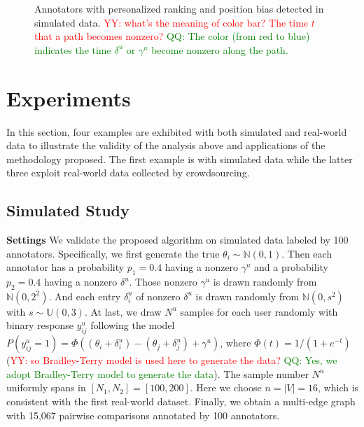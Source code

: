 \documentclass[10pt,journal,cspaper,compsoc]{IEEEtran}
\def\N{{\mathbb N}}
\begin{document}
{\begin{figure}[t]
\begin{center}
  \caption{Annotators with personalized ranking and position bias detected in simulated data. \textcolor{red}{YY: what's the meaning of color bar? The time $t$ that a path becomes nonzero?} \textcolor{green}{QQ: The color (from red to blue) indicates the time $\delta^u$ or $\gamma^u$ become nonzero along the path.}}
\end{center}
\end{figure}


\section{Experiments}\label{sec:experiment}

In this section, four examples are exhibited with both
simulated and real-world data to illustrate the validity of
the analysis above and applications of the methodology proposed.
The first example is with simulated data while the
latter three exploit real-world data collected by crowdsourcing.

\subsection{Simulated Study}
\textbf{Settings} We validate the proposed algorithm on simulated data labeled by 100 annotators.
Specifically, we first generate the true $\theta_i \sim \N(0,1)$.
Then each annotator has a probability $p_1 = 0.4$ having a nonzero $\gamma^u$ and a probability $p_2 = 0.4$ having a nonzero $\delta^u$.
Those nonzero $\gamma^u$ is drawn randomly from $\N(0,2^2)$. And each entry $\delta_i^u$ of nonzero $\delta^u$ is drawn randomly from $\N(0,s^2)$ with $s \sim \mathbb{U}(0,3)$.
At last, we draw $N^u$ samples for each user randomly with binary response $y^u_{ij}$ following the model $P(y^u_{ij} = 1) = \Phi((\theta_i+\delta_i^u) - (\theta_j+\delta_j^u) + \gamma^u)$, where $\Phi(t) = 1/(1+e^{-t})$ (\textcolor{red}{YY: so Bradley-Terry model is used here to generate the data?} \textcolor{green}{QQ: Yes, we adopt Bradley-Terry model to generate the data}).
 The sample number $N^u$ uniformly spans in $[N_1,N_2] = [100,200]$. Here we choose $n=|V|=16$, which is consistent with the first real-world dataset.  Finally, we obtain a multi-edge graph with 15,067 pairwise comparisons annotated by 100 annotators.





}
\end{document}
